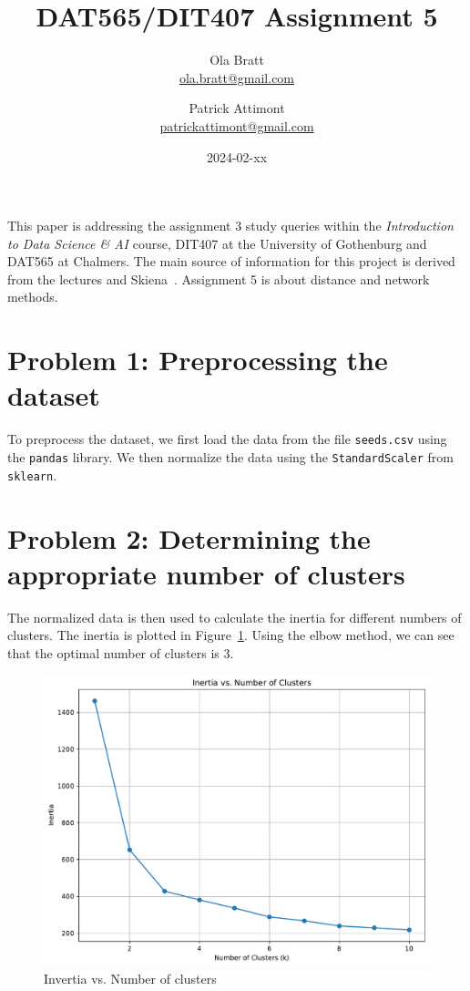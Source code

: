 \documentclass[a4paper]{article}
\begin{document}
\author{Ola Bratt \\
  \href{mailto:ola.bratt@gmail.com}{ola.bratt@gmail.com}
  \and
  Patrick Attimont \\
  \href{patrickattimont@gmail.com}{patrickattimont@gmail.com}
}

\title{DAT565/DIT407 Assignment 5}
\date{2024-02-xx}

\maketitle

This paper is addressing the assignment 3 study queries within the \emph{Introduction to Data Science \& AI} course, DIT407 at 
the University of Gothenburg and DAT565 at Chalmers. The main source of information for this project
is derived from the lectures and Skiena~\cite{Skiena:2024}. Assignment 5 is about distance and network methods.

\section*{Problem 1: Preprocessing the dataset}
To preprocess the dataset, we first load the data from the file \texttt{seeds.csv} using the \texttt{pandas} library. 
We then normalize the data using the \texttt{StandardScaler} from \texttt{sklearn}.



\section*{Problem 2: Determining the appropriate number of clusters}


The normalized data is then used to calculate the inertia for different numbers of clusters. The inertia is plotted in Figure~\ref{fig:inertia}.
Using the elbow method, we can see that the optimal number of clusters is 3.

\begin{figure}[H]
  \begin{center}
    \includegraphics[width=\textwidth]{ola/intertia.pdf}
    \caption{Invertia vs. Number of clusters}
    \label{fig:inertia}
  \end{center}
\end{figure}
\end{document}
